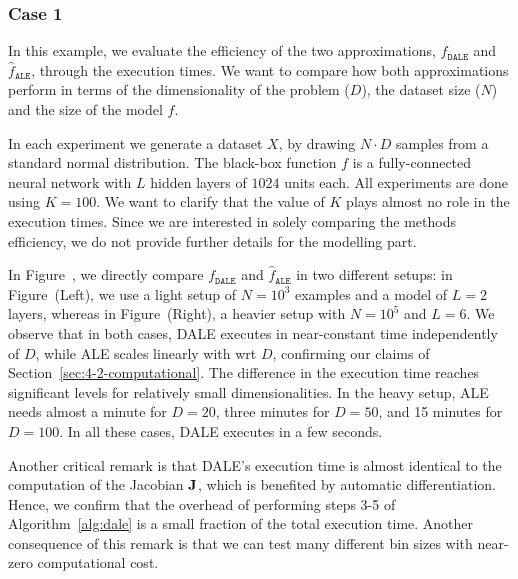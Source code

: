 \subsubsection{Case 1}
\label{sec:case-1}

In this example, we evaluate the efficiency of the two approximations, \(f_{\mathtt{DALE}}\) and \(\hat{f}_{\mathtt{ALE}}\), through the execution times. We want to compare how both approximations perform in terms of the dimensionality of the problem (\(D\)), the dataset size (\(N\)) and the size of the model \(f\).

In each experiment we generate a dataset \( X \), by drawing \( N \cdot D \) samples from a standard normal distribution. The black-box function \(f \) is a fully-connected neural network with \(L\) hidden layers of \( 1024 \) units each. All experiments are done using \(K=100\). We want to clarify that the value of \(K\) plays almost no role in the execution times. Since we are interested in solely comparing the methods efficiency, we do not provide further details for the modelling part.

In Figure~, we directly compare \(f_{\mathtt{DALE}}\) and \(\hat{f}_{\mathtt{ALE}}\) in two different setups: in Figure~(Left), we use a light setup of \(N=10^3\) examples and a model of \(L=2\) layers, whereas in Figure~(Right), a heavier setup with \(N=10^5\) and \(L=6\). We observe that in both cases, DALE executes in near-constant time independently of \(D\), while ALE scales linearly with wrt \(D\), confirming our claims of Section~\ref{sec:4-2-computational}. The difference in the execution time reaches significant levels for relatively small dimensionalities. In the heavy setup, ALE needs almost a minute for \(D=20\), three minutes for \(D=50\), and 15 minutes for \(D=100\). In all these cases, DALE executes in a few seconds.

Another critical remark is that DALE's execution time is almost identical to the computation of the Jacobian \( \mathbf{J} \), which is benefited by automatic differentiation. Hence, we confirm that the overhead of performing steps 3-5 of Algorithm~\ref{alg:dale} is a small fraction of the total execution time. Another consequence of this remark is that we can test many different bin sizes with near-zero computational cost.

